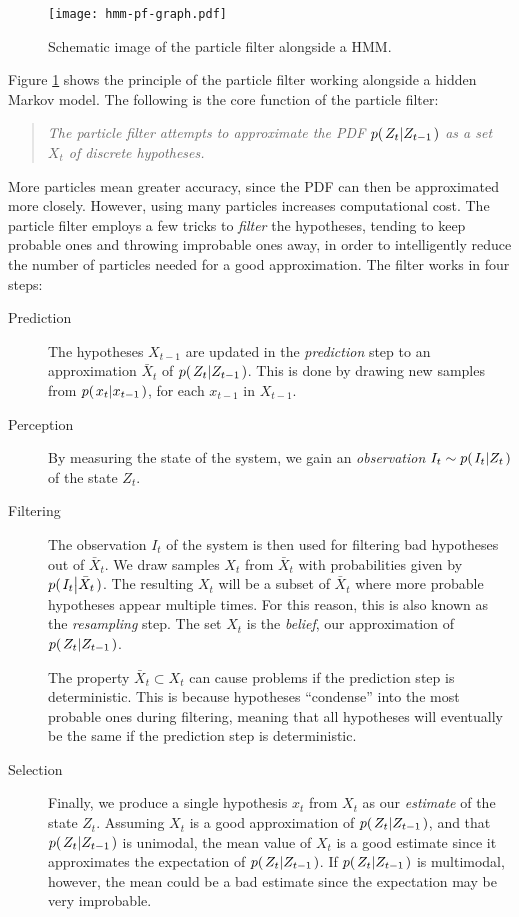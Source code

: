 \begin{figure}
  \centering
  \texttt{[image: hmm-pf-graph.pdf]}
  \caption{Schematic image of the particle filter alongside a HMM.}
  \label{fig:hmm-pf-graph}
\end{figure}

Figure \ref{fig:hmm-pf-graph} shows the principle of the particle filter
working alongside a hidden Markov model. The following is the core
function of the particle filter:

\begin{quote}
  \emph{The particle filter attempts to approximate the PDF
    $p{(\left. Z_t \middle\vert Z_{t-1} \right.)}$ as a set $X_t$ of discrete hypotheses.}
\end{quote}

More particles mean greater accuracy, since the PDF can then be
approximated more closely. However, using many particles increases
computational cost. The particle filter employs a few tricks to
\emph{filter} the hypotheses, tending to keep probable ones and
throwing improbable ones away, in order to intelligently reduce the
number of particles needed for a good approximation. The filter works
in four steps:

\begin{description}
\item[Prediction] The hypotheses $X_{t-1}$ are updated in the
  \emph{prediction} step to an approximation $\bar{X}_t$ of
  $p{(\left. Z_t \middle\vert Z_{t-1} \right.)}$.  This is done by drawing new samples from
  $p{(\left. x_t \middle\vert x_{t-1} \right.)}$, for each $x_{t-1}$ in $X_{t-1}$.
\item[Perception] By measuring the state of the system, we gain an
  \emph{observation} $I_t \sim p{(\left. I_t \middle\vert Z_t \right.)}$ of the state $Z_t$.
\item[Filtering] The observation $I_t$ of the system is then used for
  filtering bad hypotheses out of $\bar{X}_t$.  We draw samples $X_t$
  from $\bar{X}_t$ with probabilities given by
  $p{(\left. I_t \middle\vert \bar{X}_t \right.)}$. The resulting $X_t$ will be a subset of
  $\bar{X}_t$ where more probable hypotheses appear multiple
  times. For this reason, this is also known as the \emph{resampling}
  step. The set $X_t$ is the \emph{belief}, our approximation of
  $p{(\left. Z_t \middle\vert Z_{t-1} \right.)}$.
  
  The property $\bar{X}_t \subset X_t$ can cause problems if the
  prediction step is deterministic. This is because hypotheses
  ``condense'' into the most probable ones during filtering, meaning
  that all hypotheses will eventually be the same if the prediction
  step is deterministic.

\item[Selection] Finally, we produce a single hypothesis $x_t$ from
  $X_t$ as our \emph{estimate} of the state $Z_t$. Assuming $X_t$ is a
  good approximation of $p{(\left. Z_t \middle\vert Z_{t-1} \right.)}$, and that $p{(\left. Z_t \middle\vert Z_{t-1} \right.)}$ is
  unimodal, the mean value of $X_t$ is a good estimate since it
  approximates the expectation of $p{(\left. Z_t \middle\vert Z_{t-1} \right.)}$.  If $p{(\left. Z_t \middle\vert Z_{t-1} \right.)}$
  is multimodal, however, the mean could be a bad estimate since the
  expectation may be very improbable.
\end{description}

